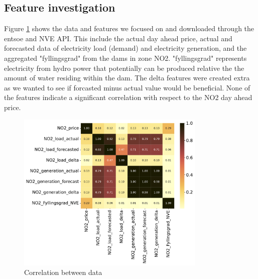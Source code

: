 \documentclass
[twocolumn,
secnumarabic,
nobibnotes,
aps,
prl,
reprint,
groupedaddress,
amsmath,
amssymb,
]{revtex4-2}
\begin{document}
\subsection{Feature investigation}
Figure \ref{fig:feature_correlation} shows the data and features we focused on and downloaded through the entsoe and NVE API. This include the actual day ahead price, actual and forecasted data of electricity load (demand) and electricity  generation, and the aggregated "fyllingsgrad" from the dams in zone NO2. "fyllingsgrad" represents electricity from hydro power that potentially can be produced relative the the amount of water residing within the dam. The delta features were created extra as we wanted to see if forcasted minus actual value would be beneficial. None of the features indicate a significant correlation with respect to the NO2 day ahead price. 
\begin{figure}[t]
  \centering
  \includegraphics[width=90mm,scale=1.0]{figures/feature_corr_analysis.pdf}
  \caption{\label{fig:feature_correlation}Correlation between data}
\end{figure}
\end{document}
